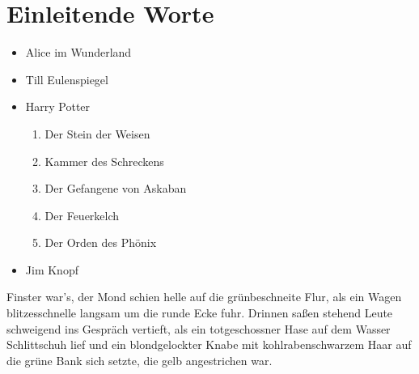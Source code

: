 

\section{Einleitende Worte}
\label{sec:einleitende Worte}
\begin{itemize}
\item Alice im Wunderland
\item Till Eulenspiegel
\item Harry Potter
\begin{enumerate}
\item Der Stein der Weisen
\item Kammer des Schreckens
\item Der Gefangene von Askaban
\item Der Feuerkelch
\item Der Orden des Phönix
\end{enumerate}
\item Jim Knopf
\end{itemize}
Finster war's, der Mond schien helle auf die grünbeschneite Flur, als
ein Wagen blitzesschnelle langsam um die runde Ecke fuhr. Drinnen
saßen stehend Leute schweigend ins Gespräch vertieft, als ein
totgeschossner Hase auf dem Wasser Schlittschuh lief und ein
blondgelockter Knabe mit kohlrabenschwarzem Haar auf die grüne Bank
sich setzte, die gelb angestrichen war.

